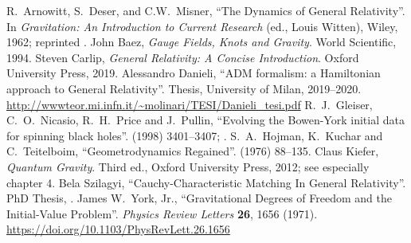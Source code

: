 
\begin{thebibliography}{99}
  R.~Arnowitt, S.~Deser, and C.W.~Misner,
  ``The Dynamics of General Relativity''.
  In \emph{Gravitation: An Introduction to Current Research}
  (ed., Louis Witten), Wiley, 1962; reprinted .
  John Baez,
  \emph{Gauge Fields, Knots and Gravity}.
  World Scientific, 1994.
  Steven Carlip,
  \emph{General Relativity: A Concise Introduction}.
  Oxford University Press, 2019.
  Alessandro Danieli,
  ``ADM formalism: a Hamiltonian approach to General Relativity''.
  Thesis, University of Milan, 2019--2020.\newline
  \url{http://wwwteor.mi.infn.it/~molinari/TESI/Danieli_tesi.pdf}
  R.~J.~Gleiser, C.~O.~Nicasio, R.~H.~Price and J.~Pullin,
  ``Evolving the Bowen-York initial data for spinning black holes''.
    (1998) 3401--3407; .\newline
  {\tt{}}
  S.~A.~Hojman, K.~Kuchar and C.~Teitelboim,
  ``Geometrodynamics Regained''.
    (1976) 88--135.\newline
  {\tt{}}
  Claus Kiefer,
  \emph{Quantum Gravity}.
  Third ed., Oxford University Press, 2012; see especially chapter 4.
  Bela Szilagyi,
  ``Cauchy-Characteristic Matching In General Relativity''.
  PhD Thesis, .
  James W.~York, Jr.,
  ``Gravitational Degrees of Freedom and the Initial-Value Problem''.
  \emph{Physics Review Letters} \textbf{26}, 1656 (1971).\newline
  \url{https://doi.org/10.1103/PhysRevLett.26.1656}
\end{thebibliography}

